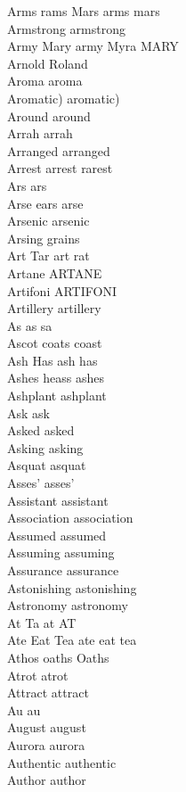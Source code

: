 Arms rams Mars arms mars\\
Armstrong armstrong\\
Army Mary army Myra MARY\\
Arnold Roland\\
Aroma aroma\\
Aromatic) aromatic)\\
Around around\\
Arrah arrah\\
Arranged arranged\\
Arrest arrest rarest\\
Ars ars\\
Arse ears arse\\
Arsenic arsenic\\
Arsing grains\\
Art Tar art rat\\
Artane ARTANE\\
Artifoni ARTIFONI\\
Artillery artillery\\
As as sa\\
Ascot coats coast\\
Ash Has ash has\\
Ashes heass ashes\\
Ashplant ashplant\\
Ask ask\\
Asked asked\\
Asking asking\\
Asquat asquat\\
Asses' asses'\\
Assistant assistant\\
Association association\\
Assumed assumed\\
Assuming assuming\\
Assurance assurance\\
Astonishing astonishing\\
Astronomy astronomy\\
At Ta at AT\\
Ate Eat Tea ate eat tea\\
Athos oaths Oaths\\
Atrot atrot\\
Attract attract\\
Au au\\
August august\\
Aurora aurora\\
Authentic authentic\\
Author author\\
